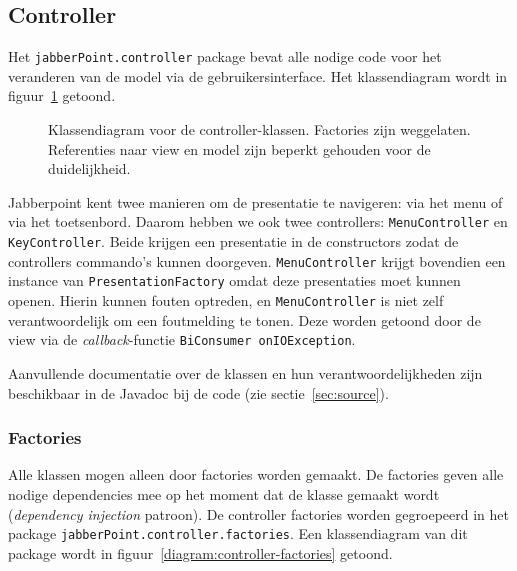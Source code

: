 \documentclass[a4paper]{article}
\newcommand{\code}[1]{\lstinline[columns=fixed]{#1}}
\begin{document}
	\subsection{Controller}\label{sec:controller}
		Het \code{jabberPoint.controller} package bevat alle nodige code voor het veranderen van de model via de gebruikersinterface.
		Het klassendiagram wordt in figuur~\ref{diagram:controller} getoond.

		\begin{figure}[!htb]
		 \caption{
			Klassendiagram voor de controller-klassen.\label{diagram:controller}
			Factories zijn weggelaten.
			Referenties naar view en model zijn beperkt gehouden voor de duidelijkheid.
		 }
		\end{figure}

		Jabberpoint kent twee manieren om de presentatie te navigeren: via het menu of via het toetsenbord.
		Daarom hebben we ook twee controllers: \code{MenuController} en \code{KeyController}.
		Beide krijgen een presentatie in de constructors zodat de controllers commando's kunnen doorgeven.
		\code{MenuController} krijgt bovendien een instance van \code{PresentationFactory} omdat deze presentaties moet kunnen openen.
		Hierin kunnen fouten optreden, en \code{MenuController} is niet zelf verantwoordelijk om een foutmelding te tonen.
		Deze worden getoond door de view via de \textit{callback}-functie \code{BiConsumer onIOException}.

		Aanvullende documentatie over de klassen en hun verantwoordelijkheden zijn beschikbaar in de Javadoc bij de code (zie sectie~\ref{sec:source}).

		\subsubsection{Factories}\label{sec:controller-factories}
			Alle klassen mogen alleen door factories worden gemaakt.
			De factories geven alle nodige dependencies mee op het moment dat de klasse gemaakt wordt (\textit{dependency injection} patroon).
			De controller factories worden gegroepeerd in het package \code{jabberPoint.controller.factories}.
			Een klassendiagram van dit package wordt in figuur~\ref{diagram:controller-factories} getoond.
\end{document}
